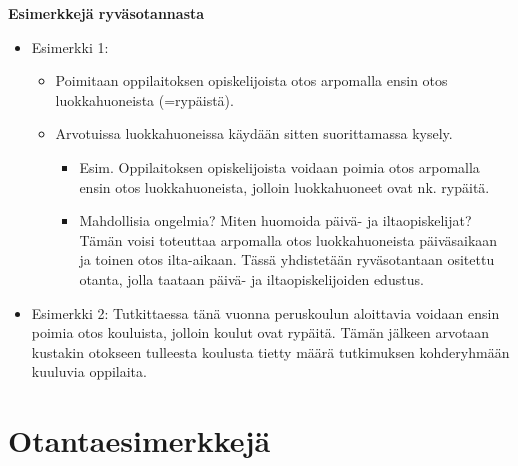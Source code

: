 \documentclass[
]{book}
\providecommand{\tightlist}{%
  \setlength{\itemsep}{0pt}\setlength{\parskip}{0pt}}
\begin{document}
\begin{eblock}{}

\textbf{Esimerkkejä ryväsotannasta}

\begin{itemize}
\tightlist
\item
  Esimerkki 1:

  \begin{itemize}
  \tightlist
  \item
    Poimitaan oppilaitoksen opiskelijoista otos arpomalla ensin otos luokkahuoneista (=rypäistä).
  \item
    Arvotuissa luokkahuoneissa käydään sitten suorittamassa kysely.

    \begin{itemize}
    \tightlist
    \item
      Esim. Oppilaitoksen opiskelijoista voidaan poimia otos arpomalla ensin otos luokkahuoneista, jolloin luokkahuoneet ovat nk. rypäitä.
    \item
      Mahdollisia ongelmia? Miten huomoida päivä- ja iltaopiskelijat? Tämän voisi toteuttaa arpomalla otos luokkahuoneista päiväsaikaan ja toinen otos ilta-aikaan. Tässä yhdistetään ryväsotantaan ositettu otanta, jolla taataan päivä- ja iltaopiskelijoiden edustus.
    \end{itemize}
  \end{itemize}
\item
  Esimerkki 2: Tutkittaessa tänä vuonna peruskoulun aloittavia voidaan ensin poimia otos kouluista, jolloin koulut ovat rypäitä. Tämän jälkeen arvotaan kustakin otokseen tulleesta koulusta tietty määrä tutkimuksen kohderyhmään kuuluvia oppilaita.
\end{itemize}

\end{eblock}

\hypertarget{alaluku72}{%
\section{Otantaesimerkkejä}\label{alaluku72}}
\end{document}
